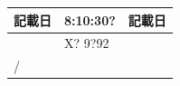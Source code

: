\documentclass[UTF8,10pt,a4paper,fontset=fandol]{ctexart}
\newcommand{\fieldvalue}[1]{#1}
\newcommand{\handwritten}[1]{#1}
\begin{document}
\noindent
\begin{tabularx}{\textwidth}{|p{}|X|p{}|}
\hline
記載日 &
\fieldvalue{\handwritten{8:10:30?}} &
記載日\\
\hline
&
\fieldvalue{\handwritten{X? 9?92}} &
\\
\hline
\multicolumn{3}{|l|}{
\fieldvalue{\handwritten{/}}
}\\
\hline
\end{tabularx}

\vspace{0.5em}
\end{document}

